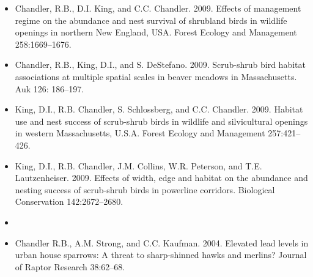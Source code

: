 \documentclass[12pt]{article}
\begin{document}
\begin{itemize}
\item Chandler, R.B., D.I. King, and C.C. Chandler. 2009. Effects
  of management regime on the abundance and nest survival of shrubland
  birds in wildlife openings in northern New England, USA. Forest
  Ecology and Management 258:1669--1676.

\item Chandler, R.B., King, D.I., and
  S. DeStefano. 2009. Scrub-shrub bird habitat associations at
  multiple spatial scales in beaver meadows in Massachusetts. Auk 126:
  186--197.

\item King, D.I., R.B. Chandler, S. Schlossberg, and
  C.C. Chandler. 2009. Habitat use and nest success of scrub-shrub
  birds in wildlife and silvicultural openings in western
  Massachusetts, U.S.A. Forest Ecology and Management 257:421--426.

\item King, D.I., R.B. Chandler, J.M. Collins, W.R. Peterson, and
  T.E. Lautzenheiser. 2009. Effects of width, edge and habitat on the
  abundance and nesting success of scrub-shrub birds in powerline
  corridors. Biological Conservation 142:2672--2680.

\item[] { \\}

\item Chandler R.B., A.M. Strong, and C.C. Kaufman. 2004. Elevated
  lead levels in urban house sparrows: A threat to sharp-shinned hawks
  and merlins? Journal of Raptor Research 38:62--68.

\end{itemize}








\begin{comment}
\emph{Technical Reports}
\begin{itemize}
  \item Chandler, R.B., D.I. King, and C.C. Chandler. 2006. Butterfly
    occurrence and species richness in wildlife openings and clearcuts
    on the White Mountain National Forest. A Report to the Wildlife TES
    Program, White Mountain National Forest.
\end{itemize}
\end{comment}

\end{document}
